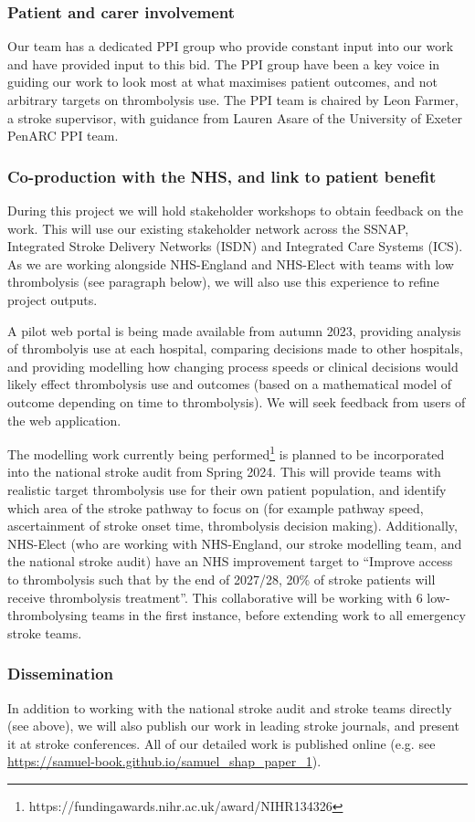 \subsubsection{Patient and carer involvement}

Our team has a dedicated PPI group who provide constant input into our work and have provided input to this bid. The PPI group have been a key voice in guiding our work to look most at what maximises patient outcomes, and not arbitrary targets on thrombolysis use. The PPI team is chaired by Leon Farmer, a stroke supervisor, with guidance from Lauren Asare of the University of Exeter PenARC PPI team.

\subsubsection{Co-production with the NHS, and link to patient benefit}

During this project we will hold stakeholder workshops to obtain feedback on the work. This will use our existing stakeholder network across the SSNAP, Integrated Stroke Delivery Networks (ISDN) and Integrated Care Systems (ICS). As we are working alongside NHS-England and NHS-Elect with teams with low thrombolysis (see paragraph below), we will also use this experience to refine project outputs.

A pilot web portal is being made available from autumn 2023, providing analysis of thrombolyis use at each hospital, comparing decisions made to other hospitals, and providing modelling how changing process speeds or clinical decisions would likely effect thrombolysis use and outcomes (based on a mathematical model of outcome depending on time to thrombolysis). We will seek feedback from users of the web application.

The modelling work currently being performed\footnote{https://fundingawards.nihr.ac.uk/award/NIHR134326} is planned to be incorporated into the national stroke audit from Spring 2024. This will provide teams with realistic target thrombolysis use for their own patient population, and identify which area of the stroke pathway to focus on (for example pathway speed, ascertainment of stroke onset time, thrombolysis decision making). Additionally, NHS-Elect (who are working with NHS-England, our stroke modelling team, and the national stroke audit) have an NHS improvement target to “Improve access to thrombolysis such that by the end of 2027/28, 20\% of stroke patients will receive thrombolysis treatment”. This collaborative will be working with 6 low-thrombolysing teams in the first instance, before extending work to all emergency stroke teams. 

\subsubsection{Dissemination}

In addition to working with the national stroke audit and stroke teams directly (see above), we will also publish our work in leading stroke journals, and present it at stroke conferences. All of our detailed work is published online (e.g. see \url{https://samuel-book.github.io/samuel_shap_paper_1}).